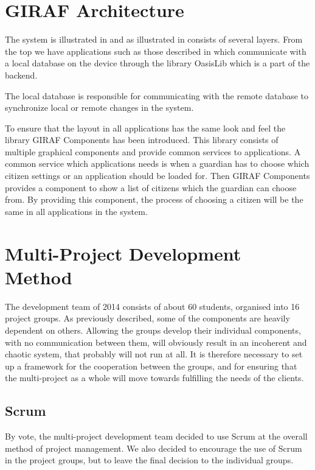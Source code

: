 \section{GIRAF Architecture}
\label{sec:giraf:architecture}
The \giraf system is illustrated in  and as illustrated in consists of several layers. From the top we have applications such as those described in  which communicate with a local database on the device through the library OasisLib which is a part of the \giraf backend.

The local database is responsible for communicating with the remote database to synchronize local or remote changes in the system.

To ensure that the layout in all applications has the same look and feel the library GIRAF Components has been introduced.
This library consists of multiple graphical components and provide common services to applications.
A common service which applications needs is when a guardian has to choose which citizen settings or an application should be loaded for. Then GIRAF Components provides a component to show a list of citizens which the guardian can choose from. By providing this component, the process of choosing a citizen will be the same in all applications in the \giraf system.


\section{Multi-Project Development Method}\label{sec:giraf:development}
The \giraf development team of 2014 consists of about 60 students, organised into 16 project groups. 
As previously described, some of the \giraf components are heavily dependent on others. 
Allowing the groups develop their individual components, with no communication between them, will obviously result in an incoherent and chaotic system, that probably will not run at all. 
It is therefore necessary to set up a framework for the cooperation between the groups, and for ensuring that the multi-project as a whole will move towards fulfilling the needs of the clients.

\subsection{Scrum}
By vote, the multi-project development team decided to use Scrum at the overall method of project management. 
We also decided to encourage the use of Scrum in the project groups, but to leave the final decision to the individual groups. 

